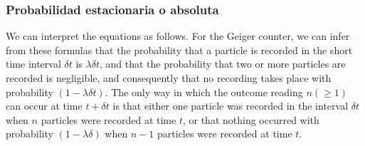 \documentclass[spanish]{beamer}
\begin{document}
\begin{frame}
\frametitle{Probabilidad estacionaria o absoluta}

We can interpret the equations as follows. For the Geiger counter, we can infer from these formulas that the probability that a particle is recorded in the short time interval $\delta t$ is $ \lambda \delta t$, and that the probability that two or more particles are recorded is negligible, and consequently that no recording takes place with probability $(1 - \lambda \delta t)$. The only way in which the outcome reading $n(\geq 1)$ can occur at time $t + \delta t$ is that either one particle was recorded in the interval $\delta t$ when $n$ particles were
recorded at time $t$, or that nothing occurred with probability $(1 - \lambda \delta)$ when $n-1$ particles were recorded at time $t$.
\end{frame}

\end{document}
